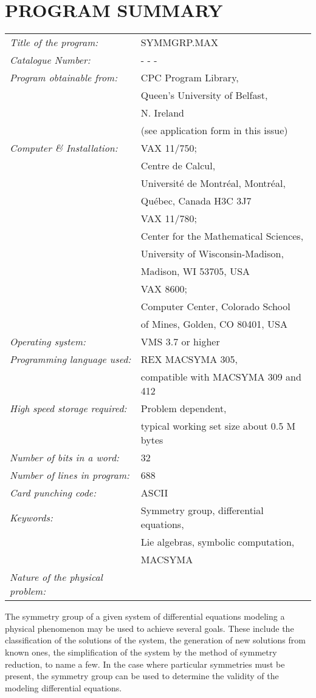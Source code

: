 \vfill
\newpage

\section*{PROGRAM SUMMARY}
\begin{tabular}{ll}

{\em Title of the program:} & SYMMGRP.MAX \\
{\em Catalogue Number:} & - - - \\
{\em Program obtainable from:} & CPC Program Library, \\
  & Queen's University of Belfast, \\
  & N. Ireland \\
  & (see application form in this issue) \\
{\em Computer \& Installation:} & VAX 11/750;  \\
  & Centre de Calcul, \\
  & Universit\'{e} de Montr\'{e}al, Montr\'{e}al, \\
  & Qu\'{e}bec, Canada H3C 3J7 \\
  & VAX 11/780; \\
  & Center for the Mathematical Sciences, \\
  & University of Wisconsin-Madison, \\
  & Madison, WI 53705, USA \\
  & VAX 8600; \\
  & Computer Center, Colorado School \\
  & of Mines, Golden, CO 80401, USA \\ 
{\em Operating system:} & VMS 3.7 or higher \\
{\em Programming language used:} & REX MACSYMA 305, \\
  & compatible with MACSYMA 309 and 412 \\
{\em High speed storage required:} & Problem dependent, \\
  & typical working set size about 0.5 M bytes \\
{\em Number of bits in a word:} & 32 \\
{\em Number of lines in program:} & 688  \\
{\em Card punching code:} & ASCII \\
{\em Keywords:} & Symmetry group, differential equations, \\
  & Lie algebras, symbolic computation,\\
  & MACSYMA \\
{\em Nature of the physical problem:} &    \\
\end{tabular}
\nopagebreak
\vskip 1pt
\noindent
The symmetry group of a given system of differential equations modeling
a physical phenomenon may be used to achieve several goals. 
These include the classification of the solutions of the system,
the generation of new solutions from known ones, 
the simplification of the system
by the method of symmetry reduction, to name a few. In the case where
particular symmetries must be present, the symmetry group can be used to
determine the validity of the modeling differential equations.

